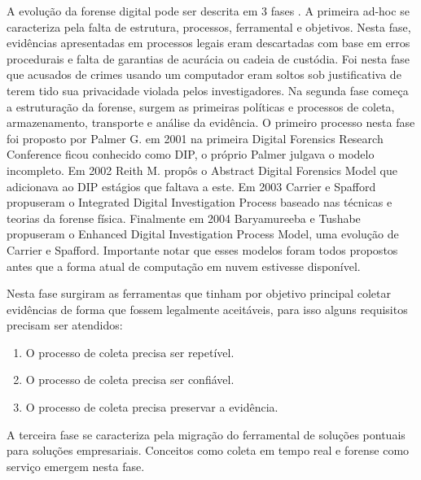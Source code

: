 \documentclass[conference]{IEEEtran}
\begin{document}
A evolução da forense digital pode ser descrita em 3 fases \cite{Charters2008}. A primeira ad-hoc se caracteriza pela falta de estrutura, processos, ferramental e 
objetivos. Nesta fase, evidências apresentadas em processos legais eram descartadas com base em erros procedurais e falta de garantias de acurácia ou cadeia de custódia. 
Foi nesta fase que acusados de crimes usando um computador eram soltos sob justificativa de terem tido sua privacidade violada pelos investigadores. 
Na segunda fase começa a estruturação da forense, surgem as primeiras políticas e processos de coleta, armazenamento, transporte e análise da evidência. O primeiro
processo nesta fase foi proposto por Palmer G. em 2001 na primeira Digital Forensics Research Conference ficou conhecido como DIP, o próprio Palmer julgava o modelo incompleto. Em 2002 
Reith M. propôs o Abstract Digital Forensics Model que adicionava ao DIP estágios que faltava a este. Em 2003 Carrier e Spafford propuseram o Integrated Digital Investigation 
Process baseado nas técnicas e teorias da forense física. Finalmente em 2004 Baryamureeba e Tushabe propuseram o Enhanced Digital Investigation Process Model, uma evolução
de Carrier e Spafford. Importante notar que esses modelos foram todos propostos antes que a forma atual de computação em nuvem estivesse disponível. \cite{Grispos2012}

Nesta fase surgiram as ferramentas que tinham por objetivo principal coletar evidências de forma que fossem legalmente aceitáveis, para isso alguns requisitos precisam 
ser atendidos:

\begin{enumerate}
 \item O processo de coleta precisa ser repetível.
 \item O processo de coleta precisa ser confiável.
 \item O processo de coleta precisa preservar a evidência.
\end{enumerate}

A terceira fase se caracteriza pela migração do ferramental de soluções pontuais para soluções empresariais. Conceitos como coleta em tempo real e forense como serviço emergem
nesta fase.
\end{document}
